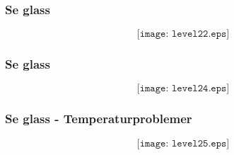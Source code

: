 \documentclass[aspectratio=169,xcolor=dvipsnames]{beamer}
\begin{document}
%
%
%
%
%
\begin{frame}
	\frametitle{Se glass}

$$\texttt{[image: level22.eps]}$$
\end{frame}
%
%
\begin{frame}
	\frametitle{Se glass}

$$\texttt{[image: level24.eps]}$$
\end{frame}
%
%
%
%
%
%
%
%
%
%
%
\begin{frame}
	\frametitle{Se glass - Temperaturproblemer}

$$\texttt{[image: level25.eps]}$$
\end{frame}
\end{document}
